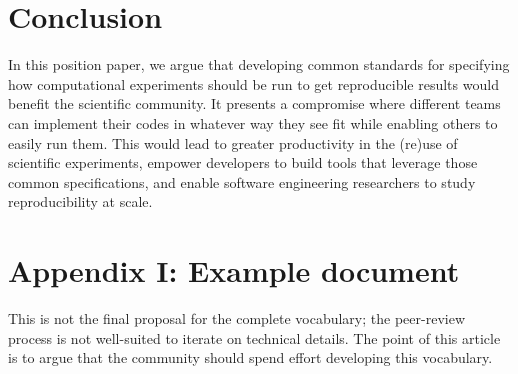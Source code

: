 \documentclass[manuscript,authordraft]{acmart}
\begin{document}
\hypertarget{conclusion}{%
\section{Conclusion}\label{conclusion}}

In this position paper, we argue that developing common standards for
specifying how computational experiments should be run to get
reproducible results would benefit the scientific community. It presents
a compromise where different teams can implement their codes in whatever
way they see fit while enabling others to easily run them. This would
lead to greater productivity in the (re)use of scientific experiments,
empower developers to build tools that leverage those common
specifications, and enable software engineering researchers to study
reproducibility at scale.

\hypertarget{appendix-i-example-document}{%
\section{Appendix I: Example
document}\label{appendix-i-example-document}}

This is not the final proposal for the complete vocabulary; the
peer-review process is not well-suited to iterate on technical details.
The point of this article is to argue that the community should spend
effort developing this vocabulary.

\small
\end{document}
